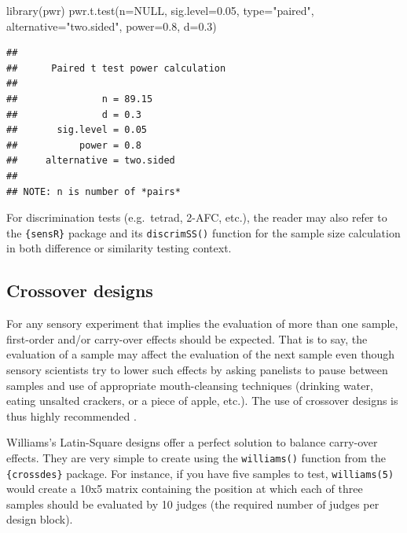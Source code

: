 \documentclass[
]{krantz}
\makeatletter
\newenvironment{Shaded}{\begin{snugshade}}{\end{snugshade}}
\newcommand{\AttributeTok}[1]{\textcolor[rgb]{0.61,0.61,0.61}{#1}}
\newcommand{\ConstantTok}[1]{\textcolor[rgb]{0,0,0}{#1}}
\newcommand{\FloatTok}[1]{\textcolor[rgb]{0.06,0.06,0.06}{#1}}
\newcommand{\FunctionTok}[1]{\textcolor[rgb]{0,0,0}{#1}}
\newcommand{\NormalTok}[1]{#1}
\newcommand{\StringTok}[1]{\textcolor[rgb]{0.5,0.5,0.5}{#1}}
\newenvironment{kframe}{%
\medskip{}
\setlength{\fboxsep}{.8em}
 \def\at@end@of@kframe{}%
 \ifinner\ifhmode%
  \def\at@end@of@kframe{\end{minipage}}%
  \begin{minipage}{\columnwidth}%
 \fi\fi%
 \def\FrameCommand##1{\hskip\@totalleftmargin \hskip-\fboxsep
 \colorbox{shadecolor}{##1}\hskip-\fboxsep
     \hskip-\linewidth \hskip-\@totalleftmargin \hskip\columnwidth}%
 \MakeFramed {\advance\hsize-\width
   \@totalleftmargin\z@ \linewidth\hsize
   \@setminipage}}%
 {\par\unskip\endMakeFramed%
 \at@end@of@kframe}
\renewenvironment{Shaded}{\begin{kframe}}{\end{kframe}}
\makeatother
\begin{document}
\begin{Shaded}
\begin{Highlighting}[]
\FunctionTok{library}\NormalTok{(pwr)}
\FunctionTok{pwr.t.test}\NormalTok{(}\AttributeTok{n=}\ConstantTok{NULL}\NormalTok{, }\AttributeTok{sig.level=}\FloatTok{0.05}\NormalTok{, }\AttributeTok{type=}\StringTok{"paired"}\NormalTok{, }\AttributeTok{alternative=}\StringTok{"two.sided"}\NormalTok{, }\AttributeTok{power=}\FloatTok{0.8}\NormalTok{, }\AttributeTok{d=}\FloatTok{0.3}\NormalTok{)}
\end{Highlighting}
\end{Shaded}

\begin{verbatim}
## 
##      Paired t test power calculation 
## 
##               n = 89.15
##               d = 0.3
##       sig.level = 0.05
##           power = 0.8
##     alternative = two.sided
## 
## NOTE: n is number of *pairs*
\end{verbatim}

For discrimination tests (e.g.~tetrad, 2-AFC, etc.), the reader may also refer to the \texttt{\{sensR\}} package and its \texttt{discrimSS()} function for the sample size calculation in both difference or similarity testing context.

\hypertarget{Crossover}{%
\subsection{Crossover designs}\label{Crossover}}

For any sensory experiment that implies the evaluation of more than one sample, first-order and/or carry-over effects should be expected. That is to say, the evaluation of a sample may affect the evaluation of the next sample even though sensory scientists try to lower such effects by asking panelists to pause between samples and use of appropriate mouth-cleansing techniques (drinking water, eating unsalted crackers, or a piece of apple, etc.). The use of crossover designs is thus highly recommended \citep{Macfie1989}.

Williams's Latin-Square designs offer a perfect solution to balance carry-over effects. They are very simple to create using the \texttt{williams()} function from the \texttt{\{crossdes\}} package. For instance, if you have five samples to test, \texttt{williams(5)} would create a 10x5 matrix containing the position at which each of three samples should be evaluated by 10 judges (the required number of judges per design block).
\end{document}

